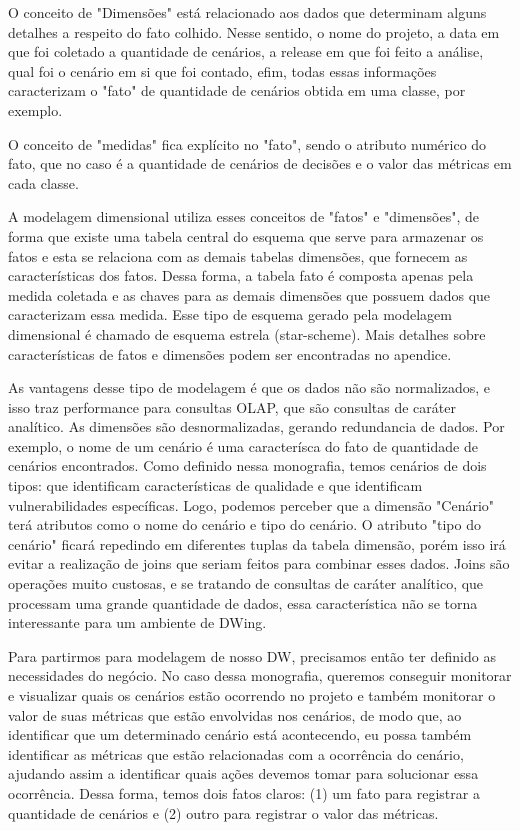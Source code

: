 O conceito de "Dimensões" está relacionado aos dados que determinam alguns detalhes a respeito do fato colhido. Nesse sentido, o nome do projeto, a data em que foi coletado a quantidade de cenários, a release em que foi feito a análise, qual foi o cenário em si que foi contado, efim, todas essas informações caracterizam o "fato" de quantidade de cenários obtida em uma classe, por exemplo.  


O conceito de "medidas" fica explícito no "fato", sendo o atributo numérico do fato, que no caso é a quantidade de cenários de decisões e o valor das métricas em cada classe. 


A modelagem dimensional utiliza esses conceitos de "fatos" e "dimensões", de forma que existe uma tabela central do esquema que serve para armazenar os fatos e esta se relaciona com as demais tabelas dimensões, que fornecem as características dos fatos. Dessa forma, a tabela fato é composta apenas pela medida coletada e as chaves para as demais dimensões que possuem dados que caracterizam essa medida. Esse tipo de esquema gerado pela modelagem dimensional é chamado de esquema estrela (star-scheme). Mais detalhes sobre características de fatos e dimensões podem ser encontradas no apendice.



As vantagens desse tipo de modelagem é que os dados não são normalizados, e isso traz performance para consultas OLAP, que são consultas de caráter analítico. As dimensões são desnormalizadas, gerando redundancia de dados. Por exemplo, o nome de um cenário é uma caracterísca do fato de quantidade de cenários encontrados. Como definido nessa monografia, temos cenários de dois tipos: que identificam características de qualidade e que identificam vulnerabilidades específicas. Logo, podemos perceber que a dimensão "Cenário" terá atributos como o nome do cenário e tipo do cenário. O atributo "tipo do cenário" ficará repedindo em diferentes tuplas da tabela dimensão, porém isso irá evitar a realização de joins que seriam feitos para combinar esses dados. Joins são operações muito custosas, e se tratando de consultas de caráter analítico, que processam uma grande quantidade de dados, essa característica não se torna interessante para um ambiente de DWing.


Para partirmos para modelagem de nosso DW,  precisamos então ter definido as necessidades do negócio. No caso dessa monografia, queremos conseguir monitorar e visualizar quais os cenários estão ocorrendo no projeto e também monitorar o valor de suas métricas que estão envolvidas nos cenários, de modo que, ao identificar que um determinado cenário está acontecendo, eu possa também identificar as métricas que estão relacionadas com a ocorrência do cenário, ajudando assim a identificar quais ações devemos tomar para solucionar essa ocorrência. Dessa forma, temos dois fatos claros: (1) um fato para registrar a quantidade de cenários e (2) outro para registrar o valor das métricas.

